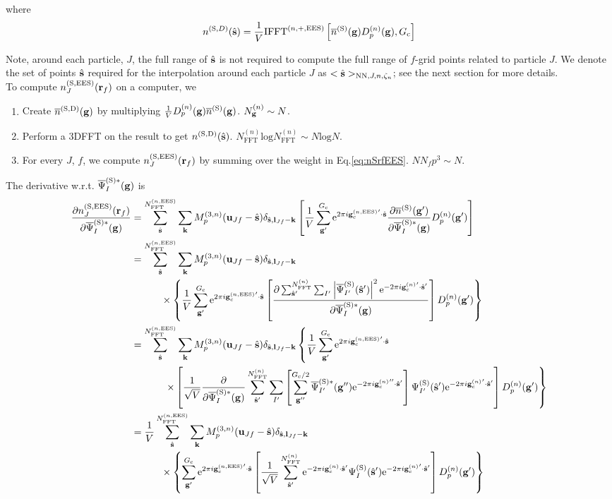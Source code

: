 \documentclass[paper=a4, fontsize=11pt]{article} %
\numberwithin{equation}{section} %
\numberwithin{figure}{section} %
\numberwithin{table}{section} %
\newcommand{\p}{\partial}
\newcommand{\ol}{\overline}
\newcommand{\bu}{{\bf{u}}}
\newcommand{\bl}{{\bf{l}}}
\newcommand{\bk}{{\bf{k}}}
\newcommand{\bs}{{\bf{s}}}
\newcommand{\bg}{{\bf{g}}}
\newcommand{\br}{{\bf{r}}}
\newcommand{\hs}{{\hat{\bf{s}}}}
\newcommand{\rS}{{\mathrm{S}}}
\newcommand{\rEES}{{\mathrm{EES}}}
\newcommand{\rNN}{{\mathrm{NN}}}
\newcommand{\re}{{\mathrm{e}}}
\newcommand{\rD}{{\mathrm{D}}}
\newcommand{\rl}{{\mathrm{log}}}
\newcommand{\gcn}{{\bg_c^{(n)}}}
\newcommand{\gcnEES}{{\bg_c^{(n,\rEES)}}}
\newcommand{\igpcnEESs}{2\pi i\gcnEES'\cdot\hat \bs}
\newcommand{\psigsc}{{\overline \Psi_I^{(\rS)*}(\bg)}}
\newcommand{\NFFTn}{{N^{(n)}_{\mathrm{FFT}}}}
\newcommand{\NFFTnEES}{{N^{(n,\rEES)}_{\mathrm{FFT}}}}
\newcommand{\Ngn}{{N^{(n)}_\bg}}
\newcommand{\Gc}{{G_{\mathrm{c}}}}
\newcommand{\Mn}{{M_p^{(3,n)}}}
\newcommand{\IFFTnEES}{{\mathrm{IFFT}^{(n,+,\rEES)}}}
\newcommand{\hsJn}{{<\hs>_{\rNN,J,n,\zeta_n}}}
\begin{document}
where
\begin{equation}
n^{(\rS,D)}(\hat \bs) = \frac{1}{V} \IFFTnEES \left[ \ol n^{(\rS)}(\bg) D^{(n)}_p(\bg) ,\Gc\right]
\end{equation}

Note, around each particle, $J$, the full range of $\hs$ is not required to compute the full range of $f$-grid points related to particle $J$.
We denote the set of points $\hs$ required for the interpolation around each particle $J$ as
$\hsJn$; see the next section for more details.\\

To compute $n_J^{(\rS,\rEES)}(\br_f)$ on a computer, we
\begin{enumerate}
\item Create $\ol n^{(\rS,\rD)}(\bg)$ by multiplying $\frac{1}{V}D^{(n)}_p(\bg)\ol n^{(\rS)}(\bg)$. $\Ngn \sim N$.
\item Perform a 3DFFT on the result to get $n^{(\rS,\rD)}(\hat \bs)$. $\NFFTn \rl \NFFTn \sim N \rl N$.
\item For every $J$, $f$, we compute $n_J^{(\rS,\rEES)}(\br_f)$ by summing over the weight in Eq.\eqref{eq:nSrfEES}. $N N_f p^3 \sim N$.
\end{enumerate}

The derivative w.r.t. $\psigsc$ is
\begin{equation} \label{eq:dnsrfdp}
\begin{split}
\frac{\p n_J^{(\rS,\rEES)}(\br_f)}{\p \psigsc}
&= \sum_{\hs}^{\NFFTnEES} \sum_{\bk} \Mn(\bu_{Jf}-\hat \bs)\delta_{\hat \bs,\bl_{Jf}-\bk}\left[ \frac{1}{V} \sum_{\bg'}^{\Gc} \re^{\igpcnEESs} \frac{\p \ol n^{(\rS)}(\bg')}{\p \psigsc} D^{(n)}_p(\bg') \right] \\
&= \sum_{\hs}^{\NFFTnEES} \sum_{\bk} \Mn(\bu_{Jf}-\hat \bs)\delta_{\hat \bs,\bl_{Jf}-\bk}\\
&\ \ \ \ \ \ \ \ \ \times\left\{ \frac{1}{V} \sum_{\bg'}^{\Gc} \re^{\igpcnEESs} \left[\frac{\p \sum_{\hs'}^{\NFFTn}  \sum_{I'} \left| \overline \Psi_{I'}^{(\rS)}(\hat \bs') \right|^2  \re^{-2\pi i \gcn'\cdot\hat \bs'}}{\p \psigsc} \right]D^{(n)}_p(\bg') \right\} \\
&= \sum_{\hs}^{\NFFTnEES} \sum_{\bk} \Mn(\bu_{Jf}-\hat \bs)\delta_{\hat \bs,\bl_{Jf}-\bk}\left\{ \frac{1}{V} \sum_{\bg'}^{\Gc} \re^{\igpcnEESs} \right. \\
&\left.\ \ \ \ \ \ \ \ \ \ \times \left[\frac{1}{\sqrt V} \frac{\p }{ \p \psigsc} \sum_{\hs'}^{\NFFTn}  \sum_{I'}  \left[\sum_{\bg''}^{\Gc/2} \overline{\Psi}_{I'}^{(\rS)*}(\bg'')  \re^{-2\pi i \gcn'' \cdot \hat \bs'}\right] \Psi_{I'}^{(\rS)}(\hat \bs') \re^{-2\pi i \gcn' \cdot \hat \bs'} \right] D^{(n)}_p(\bg') \right\} \\
& = \frac{1}{V} \sum_{\hs}^{\NFFTnEES} \sum_{\bk} \Mn(\bu_{Jf}-\hat \bs)\delta_{\hat \bs,\bl_{Jf}-\bk}\\
&\ \ \ \ \ \ \ \ \ \times \left\{\sum_{\bg'}^{\Gc} \re^{\igpcnEESs} \left[\frac{1}{\sqrt V} \sum_{\hat \bs'}^{\NFFTn}   \re^{-2\pi i \gcn \cdot \hat \bs'}\Psi_{I}^{(\rS)}(\hat \bs') \re^{-2\pi i \gcn' \cdot \hat \bs'} \right]D^{(n)}_p(\bg') \right\} \\
\end{split}
\end{equation}
\end{document}
